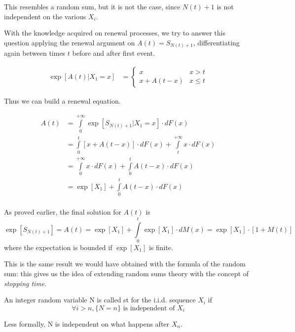 This resembles a random sum, but it is not the case, since $N(t) + 1$ is not independent on the various $X_i$.

With the knowledge acquired on renewal processes, we try to answer this question applying the renewal argument on $ A(t) = S_{N(t)+1} $, differentiating again between times $t$ before and after first event.

\begin{equation}\begin{split}
	\exp[A(t)|X_1=x] &=
	\begin{cases}
		x & x>t \\
		x + A(t-x) & x \le t
	\end{cases}
\end{split} \end{equation}

Thus we can build a renewal equation.

\begin{equation} \begin{split}
	A(t) &= \int\limits_0^{+\infty} \exp[S_{N(t)+1}|X_1 = x] \cdot dF(x) \\
	&= \int\limits_0^{t} [x+ A(t-x)] \cdot dF(x) + \int\limits_t^{+\infty} x \cdot dF(x) \\
	&= \int\limits_0^{+\infty} x \cdot dF(x) + \int\limits_0^{t} A(t-x) \cdot dF(x) \\
	&= \exp[X_1] + \int\limits_0^{t} A(t-x) \cdot dF(x)\\
\end{split}\end{equation}

As proved earlier, the final solution for $A(t)$ is
$$ \exp[S_{N(t)+1}] = A(t) = \exp[X_1] + \int\limits_0^{t} \exp[X_1] \cdot dM(x) = \exp[X_1]\cdot [1+M(t)] $$
where the expectation is bounded if $\exp[X_1]$ is finite.

This is the same result we would have obtained with the formula of the random sum: this gives us the idea of extending random sums theory with the concept of \emph{stopping time}.

\begin{definition}
An integer random variable N is called \gls{st} for the i.i.d. sequence $X_i$ if
\begin{equation}
	\forall i > n, \{N=n\} \text{ is independent of }X_i
\end{equation}

Less formally, N is independent on what happens after $X_n$.
\end{definition}

